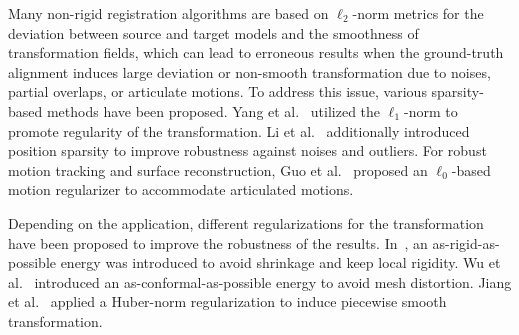 Many non-rigid registration algorithms are based on $\ell_2$-norm metrics for the deviation between source and target models and the smoothness of transformation fields, which can lead to erroneous results when the ground-truth alignment induces large deviation or non-smooth transformation due to noises, partial overlaps, or articulate motions.
To address this issue, various sparsity-based methods have been proposed. Yang et al.~\cite{yang2015sparse} utilized the $\ell_1$-norm to promote regularity of the transformation. Li et al.~\cite{li2018robust} additionally introduced position sparsity to improve robustness against noises and outliers. For robust motion tracking and surface reconstruction, Guo et al.~\cite{guo2015robust} proposed an $\ell_0$-based motion regularizer to accommodate articulated motions.

Depending on the application, different regularizations for the transformation have been proposed to improve the robustness of the results. In~\cite{dyke2019non}, an as-rigid-as-possible energy was introduced to avoid shrinkage and keep local rigidity. Wu et al.~\cite{wu2019global} introduced an as-conformal-as-possible energy to avoid mesh distortion. Jiang et al.~\cite{jiang2019huber} applied a Huber-norm regularization to induce piecewise smooth transformation. 
